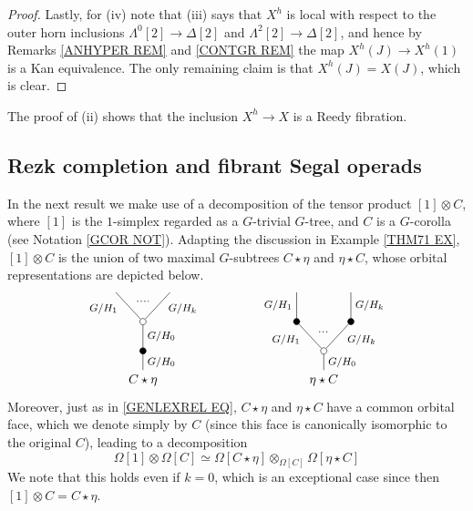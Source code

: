 \documentclass[a4paper,10pt
]{article}%
\begin{document}
\begin{proof}
Lastly, for (iv) note that (iii) says that $X^h$ is local with respect to the outer horn inclusions
$\Lambda^0[2] \to \Delta[2]$ and
$\Lambda^2[2] \to \Delta[2]$, 
and hence by Remarks 
\ref{ANHYPER REM} and \ref{CONTGR REM}
the map 
$X^h(J) \to X^h(1)$ 
is a Kan equivalence.
The only remaining claim is that
$X^h(J) = X(J)$, which is clear.
\end{proof}

\begin{remark}
The proof of (ii) shows that the inclusion $X^h \to X$ is a Reedy fibration.
\end{remark}



\subsection{Rezk completion and fibrant Segal operads}
\label{REZKCOMP SEC}

In the next result we make use of a decomposition of the tensor product $[1] \otimes C$,
where $[1]$ is the $1$-simplex regarded as a $G$-trivial $G$-tree, and $C$ is a $G$-corolla 
(see Notation \ref{GCOR NOT}). Adapting the discussion
in Example \ref{THM71 EX}, $[1] \otimes C$ is the union of two maximal $G$-subtrees $C \star \eta$ and $\eta \star C$,
whose orbital representations are depicted below.
\[
\begin{tikzpicture}
[grow=up,auto,level distance=2.3em,every node/.style = {font=\footnotesize},dummy/.style={circle,draw,inner sep=0pt,minimum size=1.75mm}]
	\node at (0,0) [font=\normalsize] {$C \star \eta$}
		child{node [dummy,fill=black] {}
			child{node [dummy] {}
				child{
				edge from parent node [swap,near end] {$G/H_k$} node [name=Kn] {}}
				child{
				edge from parent node [near end] {$G/H_1$}
node [name=Kone,swap] {}}
			edge from parent node [swap] {$G/H_0$}}
		edge from parent node [swap] {$G/H_0$}};
		\draw [dotted,thick] (Kone) -- (Kn) ;
	\node at (5,0) [font=\normalsize] {$\eta \star C$}
		child{node [dummy] {}
			child{node [dummy,fill=black] {}
				child{
				edge from parent node [swap] {$G/H_k$}}
			edge from parent node [swap,near end] {$G/H_k$} node [name=Kn] {}}
			child{node [dummy,fill=black] {}
				child{
				edge from parent node {$G/H_1$}}
			edge from parent node [near end] {$G/H_1$}
node [name=Kone,swap] {}}
		edge from parent node [swap] {$G/H_0$}
		};
		\draw [dotted,thick] (Kone) -- (Kn) ;
\end{tikzpicture}
\]
Moreover, just as in \eqref{GENLEXREL EQ}, 
$C \star \eta$ and $\eta \star C$ have a common orbital face, which we denote simply by $C$
(since this face is canonically isomorphic to the original $C$),
leading to a decomposition
\[
\Omega[1] \otimes \Omega[C]
	\simeq
\Omega[C \star \eta] \otimes_{\Omega[C]} \Omega[\eta \star C]
\]
We note that this holds even if $k=0$, 
which is an exceptional case since then
$[1] \otimes C = C \star \eta$.
\end{document}
